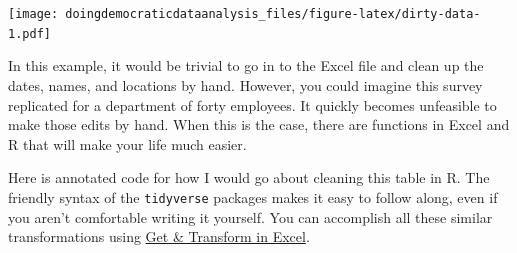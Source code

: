 \documentclass[
]{book}
\newenvironment{Shaded}{\begin{snugshade}}{\end{snugshade}}
\newcommand{\DataTypeTok}[1]{\textcolor[rgb]{0.13,0.29,0.53}{#1}}
\newcommand{\KeywordTok}[1]{\textcolor[rgb]{0.13,0.29,0.53}{\textbf{#1}}}
\newcommand{\NormalTok}[1]{#1}
\newcommand{\OperatorTok}[1]{\textcolor[rgb]{0.81,0.36,0.00}{\textbf{#1}}}
\newcommand{\OtherTok}[1]{\textcolor[rgb]{0.56,0.35,0.01}{#1}}
\newcommand{\StringTok}[1]{\textcolor[rgb]{0.31,0.60,0.02}{#1}}
\begin{document}
\begin{Shaded}
\end{Shaded}

\texttt{[image: doingdemocraticdataanalysis\_files/figure-latex/dirty-data-1.pdf]}

In this example, it would be trivial to go in to the Excel file and clean up the dates, names, and locations by hand. However, you could imagine this survey replicated for a department of forty employees. It quickly becomes unfeasible to make those edits by hand. When this is the case, there are functions in Excel and R that will make your life much easier.

Here is annotated code for how I would go about cleaning this table in R. The friendly syntax of the \texttt{tidyverse} packages makes it easy to follow along, even if you aren't comfortable writing it yourself. You can accomplish all these similar transformations using \href{https://support.microsoft.com/en-us/office/power-query-101-008b3f46-5b14-4f8b-9a07-d3da689091b5}{Get \& Transform in Excel}.
\end{document}
